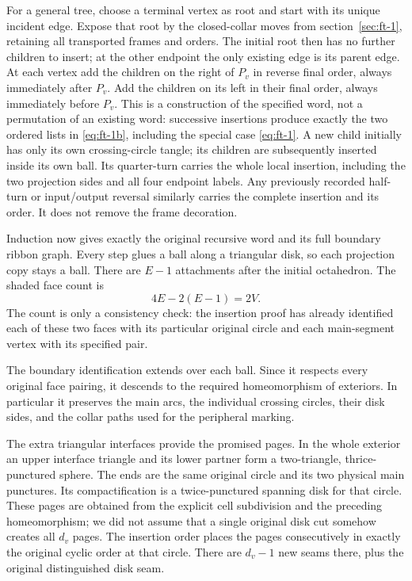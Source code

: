 For a general tree, choose a terminal vertex as root and start with its unique incident edge. Expose that root by the closed-collar moves from section~\ref{sec:ft-1}, retaining all transported frames and orders. The initial root then has no further children to insert; at the other endpoint the only existing edge is its parent edge. At each vertex add the children on the right of \(P_v\) in reverse final order, always immediately after \(P_v\). Add the children on its left in their final order, always immediately before \(P_v\). This is a construction of the specified word, not a permutation of an existing word: successive insertions produce exactly the two ordered lists in \eqref{eq:ft-1b}, including the special case \eqref{eq:ft-1}. A new child initially has only its own crossing-circle tangle; its children are subsequently inserted inside its own ball. Its quarter-turn carries the whole local insertion, including the two projection sides and all four endpoint labels. Any previously recorded half-turn or input/output reversal similarly carries the complete insertion and its order. It does not remove the frame decoration.

Induction now gives exactly the original recursive word and its full boundary ribbon graph. Every step glues a ball along a triangular disk, so each projection copy stays a ball. There are \(E-1\) attachments after the initial octahedron. The shaded face count is
\begin{equation}
4E-2(E-1)=2V.
\label{eq:ft-8}
\end{equation}
The count is only a consistency check: the insertion proof has already identified each of these two faces with its particular original circle and each main-segment vertex with its specified pair.

The boundary identification extends over each ball. Since it respects
every original face pairing, it descends to the required homeomorphism
of exteriors. In particular it preserves the main arcs, the individual
crossing circles, their disk sides, and the collar paths used for the
peripheral marking.

The extra triangular interfaces provide the promised pages. In the whole exterior an upper interface triangle and its lower partner form a two-triangle, thrice-punctured sphere. The ends are the same original circle and its two physical main punctures. Its compactification is a twice-punctured spanning disk for that circle. These pages are obtained from the explicit cell subdivision and the preceding homeomorphism; we did not assume that a single original disk cut somehow creates all \(d_v\) pages. The insertion order places the pages consecutively in exactly the original cyclic order at that circle. There are \(d_v-1\) new seams there, plus the original distinguished disk seam.


